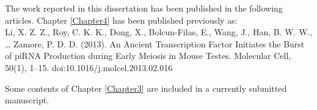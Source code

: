 \prefaceSection{}

The work reported in this dissertation has been published in the following articles.
Chapter \ref{Chapter4} has been published previously as:\\
Li, X. Z. Z., Roy, C. K. K., Dong, X., Bolcun-Filas, E., Wang, J., Han, B. W. W., … Zamore, P. D. D. (2013). An Ancient Transcription Factor Initiates the Burst of piRNA Production during Early Meiosis in Mouse Testes. Molecular Cell, 50(1), 1–15. doi:10.1016/j.molcel.2013.02.016

Some contents of Chapter \ref{Chapter3} are included in a currently submitted manuscript. 

\clearpage